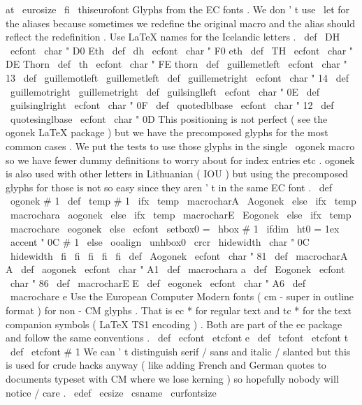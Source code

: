 {{{{{{}
at
\
eurosize
\
fi
\
thiseurofont
}
%
Glyphs
from
the
EC
fonts
.
We
don
'
t
use
\
let
for
the
aliases
because
%
sometimes
we
redefine
the
original
macro
and
the
alias
should
reflect
%
the
redefinition
.
%
%
Use
LaTeX
names
for
the
Icelandic
letters
.
\
def
\
DH
{
{
\
ecfont
\
char
"
D0
}
}
%
Eth
\
def
\
dh
{
{
\
ecfont
\
char
"
F0
}
}
%
eth
\
def
\
TH
{
{
\
ecfont
\
char
"
DE
}
}
%
Thorn
\
def
\
th
{
{
\
ecfont
\
char
"
FE
}
}
%
thorn
%
\
def
\
guillemetleft
{
{
\
ecfont
\
char
"
13
}
}
\
def
\
guillemotleft
{
\
guillemetleft
}
\
def
\
guillemetright
{
{
\
ecfont
\
char
"
14
}
}
\
def
\
guillemotright
{
\
guillemetright
}
\
def
\
guilsinglleft
{
{
\
ecfont
\
char
"
0E
}
}
\
def
\
guilsinglright
{
{
\
ecfont
\
char
"
0F
}
}
\
def
\
quotedblbase
{
{
\
ecfont
\
char
"
12
}
}
\
def
\
quotesinglbase
{
{
\
ecfont
\
char
"
0D
}
}
%
%
This
positioning
is
not
perfect
(
see
the
ogonek
LaTeX
package
)
but
%
we
have
the
precomposed
glyphs
for
the
most
common
cases
.
We
put
the
%
tests
to
use
those
glyphs
in
the
single
\
ogonek
macro
so
we
have
fewer
%
dummy
definitions
to
worry
about
for
index
entries
etc
.
%
%
ogonek
is
also
used
with
other
letters
in
Lithuanian
(
IOU
)
but
using
%
the
precomposed
glyphs
for
those
is
not
so
easy
since
they
aren
'
t
in
%
the
same
EC
font
.
\
def
\
ogonek
#
1
{
{
%
\
def
\
temp
{
#
1
}
%
\
ifx
\
temp
\
macrocharA
\
Aogonek
\
else
\
ifx
\
temp
\
macrochara
\
aogonek
\
else
\
ifx
\
temp
\
macrocharE
\
Eogonek
\
else
\
ifx
\
temp
\
macrochare
\
eogonek
\
else
\
ecfont
\
setbox0
=
\
hbox
{
#
1
}
%
\
ifdim
\
ht0
=
1ex
\
accent
"
0C
#
1
%
\
else
\
ooalign
{
\
unhbox0
\
crcr
\
hidewidth
\
char
"
0C
\
hidewidth
}
%
\
fi
\
fi
\
fi
\
fi
\
fi
}
%
}
\
def
\
Aogonek
{
{
\
ecfont
\
char
"
81
}
}
\
def
\
macrocharA
{
A
}
\
def
\
aogonek
{
{
\
ecfont
\
char
"
A1
}
}
\
def
\
macrochara
{
a
}
\
def
\
Eogonek
{
{
\
ecfont
\
char
"
86
}
}
\
def
\
macrocharE
{
E
}
\
def
\
eogonek
{
{
\
ecfont
\
char
"
A6
}
}
\
def
\
macrochare
{
e
}
%
%
Use
the
European
Computer
Modern
fonts
(
cm
-
super
in
outline
format
)
%
for
non
-
CM
glyphs
.
That
is
ec
*
for
regular
text
and
tc
*
for
the
text
%
companion
symbols
(
LaTeX
TS1
encoding
)
.
Both
are
part
of
the
ec
%
package
and
follow
the
same
conventions
.
%
\
def
\
ecfont
{
\
etcfont
{
e
}
}
\
def
\
tcfont
{
\
etcfont
{
t
}
}
%
\
def
\
etcfont
#
1
{
%
%
We
can
'
t
distinguish
serif
/
sans
and
italic
/
slanted
but
this
%
is
used
for
crude
hacks
anyway
(
like
adding
French
and
German
%
quotes
to
documents
typeset
with
CM
where
we
lose
kerning
)
so
%
hopefully
nobody
will
notice
/
care
.
\
edef
\
ecsize
{
\
csname
\
curfontsize
}}}}}}
